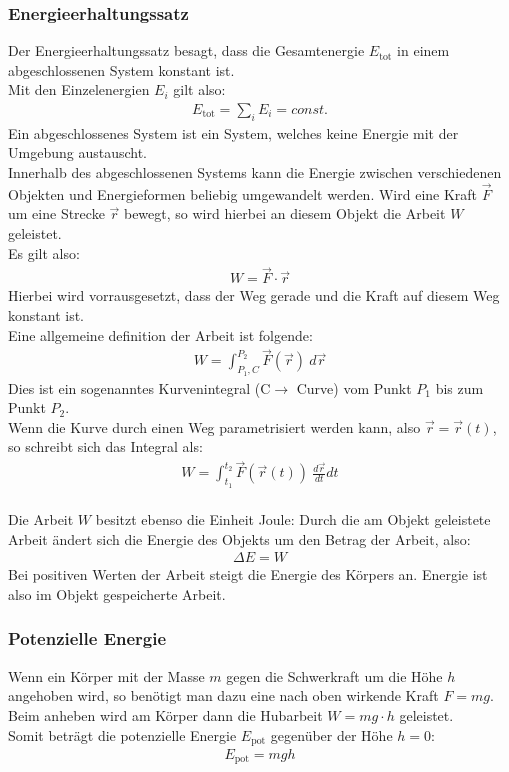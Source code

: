 \documentclass{article}
\begin{document}
\subsubsection{Energieerhaltungssatz}
Der Energieerhaltungssatz besagt, dass die Gesamtenergie $E_\mathrm{tot}$ in einem abgeschlossenen System konstant ist. \\
Mit den Einzelenergien $E_i$ gilt also:
\begin{align}
    E_\mathrm{tot}=\sum_i E_i=const.
\end{align}
Ein abgeschlossenes System ist ein System, welches keine Energie mit der Umgebung austauscht.\\

Innerhalb des abgeschlossenen Systems kann die Energie zwischen verschiedenen Objekten und Energieformen beliebig umgewandelt werden.
Wird eine Kraft $\vec{F}$ um eine Strecke $\vec{r}$ bewegt, so wird hierbei an diesem Objekt die Arbeit $W$ geleistet.\\
Es gilt also:
\begin{align}
    W=\vec{F}\cdot \vec{r}
\end{align}
Hierbei wird vorrausgesetzt, dass der Weg gerade und die Kraft auf diesem Weg konstant ist.\\

\noindent Eine allgemeine definition der Arbeit ist folgende:
\begin{align}
    W=\int_{P_1, C}^{P_2} \vec{F}(\vec{r})\ d\vec{r}
\end{align}
Dies ist ein sogenanntes Kurvenintegral (C$\rightarrow$ Curve) vom Punkt $P_1$ bis zum Punkt $P_2$.\\
Wenn die Kurve durch einen Weg parametrisiert werden kann, also $\vec{r}=\vec{r}(t)$, so schreibt sich das Integral als:
\begin{align}
    W=\int_{t_1}^{t_2} \vec{F}(\vec{r}(t))\ \frac{d\vec{r}}{dt}dt
\end{align}
\\


 Die Arbeit $W$ besitzt ebenso die Einheit Joule:
Durch die am Objekt geleistete Arbeit ändert sich die Energie des Objekts um den Betrag der Arbeit, also:
\begin{align}
    \Delta E=W
\end{align}
Bei positiven Werten der Arbeit steigt die Energie des Körpers an. Energie ist also im Objekt gespeicherte Arbeit.


\subsubsection{Potenzielle Energie}
Wenn ein Körper mit der Masse $m$ gegen die Schwerkraft um die Höhe $h$ angehoben wird, so benötigt man dazu eine nach oben
wirkende Kraft $F=mg$. Beim anheben wird am Körper dann die Hubarbeit $W=mg\cdot h$ geleistet.\\
Somit beträgt die potenzielle Energie $E_\mathrm{pot}$ gegenüber der Höhe $h=0$:
\begin{align}
    E_\mathrm{pot}=mgh
\end{align}
\end{document}
